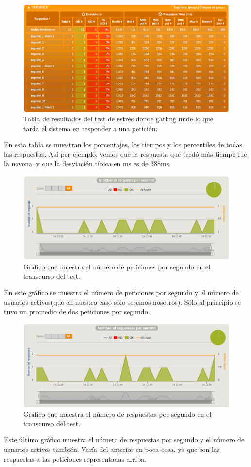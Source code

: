 \begin{itemize}
	\begin{figure}[H]
		\centering
		\includegraphics[width=0.7\linewidth]{Gatling_results1}
		\caption[Table resultados]{Tabla de resultados del test de estrés donde gatling mide lo que tarda el sistema en responder a una petición.}
		\label{fig:Gatling_results1}
	\end{figure}
	
	En esta tabla se muestran los porcentajes, los tiempos y los percentiles de todas las respuestas.  Así por ejemplo, vemos que la respuesta que tardó más tiempo fue la novena, y que la desviación típica en ms es de 388ms.
	
	\begin{figure}[H]
		\centering
		\includegraphics[width=0.7\linewidth]{NumeroRequestGatling}
		\caption[Peticiones por segundo]{Gráfico que muestra el número de peticiones por segundo en el transcurso del test.}
		\label{fig:NumeroRequestGatling}
	\end{figure}
	
	En este gráfico se muestra el número de peticiones por segundo y el número de usuarios activos(que en nuestro caso solo seremos nosotros). Sólo al principio se tuvo un promedio de dos peticiones por segundo.
	
	\begin{figure}[H]
		\centering
		\includegraphics[width=0.7\linewidth]{NumeroRespuestasGatling}
		\caption[Respuestas gatling]{Gráfico que muestra el número de respuestas por segundo en el transcurso del test.}
		\label{fig:NumeroRespuestasGatling}
	\end{figure}
	
	Este último gráfico muestra el número de respuestas por segundo y el número de usuarios activos también. Varía del anterior en poca cosa, ya que son las respuestas a las peticiones representadas arriba. 
	
\end{itemize}
